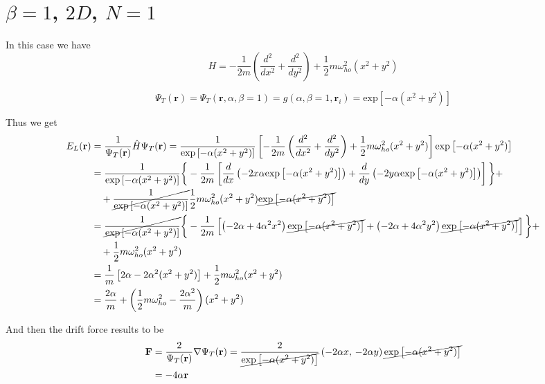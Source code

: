 \documentclass{article}
\begin{document}
\section{$\beta = 1$, $2D$, $N=1$}
In this case we have
\begin{equation*}
     H = -\frac{1}{2m} \left( \frac{d^2}{dx^2} + \frac{d^2}{dy^2} \right) + \frac{1}{2} m \omega_{ho}^2 (x^2 + y^2)
\end{equation*}

\begin{equation*}
    \Psi_T(\mathbf{r})=\Psi_T(\mathbf{r},\alpha,\beta=1)
    = g(\alpha,\beta=1,\mathbf{r}_i) = \text{exp}\left[-\alpha (x^2 + y^2) \right]
\end{equation*}

Thus we get
\begin{align*}
    E_L(\mathbf{r}) &= \frac{1}{\Psi_T(\mathbf{r})} \hat{H} \Psi_T(\mathbf{r}) = \frac{1}{\text{exp}\left[-\alpha (x^2 + y^2) \right]} \left[ -\frac{1}{2m} \left( \frac{d^2}{dx^2} + \frac{d^2}{dy^2} \right) + \frac{1}{2} m \omega_{ho}^2 (x^2 + y^2) \right] \text{exp}\left[-\alpha (x^2 + y^2) \right] \\
    &= \frac{1}{\text{exp}\left[-\alpha (x^2 + y^2) \right]} \bigg\{ -\frac{1}{2m} \left[ \frac{d}{dx} \left( -2x\alpha \text{exp}\left[-\alpha (x^2 + y^2) \right] \right) + \frac{d}{dy} \left( -2y\alpha \text{exp}\left[-\alpha (x^2 + y^2) \right] \right) \right]\bigg\} + \\
    &\quad + \cancel{\frac{1}{\text{exp}\left[-\alpha (x^2 + y^2) \right]}} \frac{1}{2} m \omega_{ho}^2 (x^2 + y^2) \cancel{\text{exp}\left[-\alpha (x^2 + y^2) \right]}  \\
    &= \cancel{\frac{1}{\text{exp}\left[-\alpha (x^2 + y^2) \right]}} \bigg\{ -\frac{1}{2m} \left[ \left( -2\alpha + 4\alpha^2x^2 \right) \cancel{\text{exp}\left[-\alpha (x^2 + y^2) \right]} + \left( -2\alpha + 4\alpha^2 y^2 \right) \cancel{\text{exp}\left[-\alpha (x^2 + y^2) \right]}  \right]\bigg\} + \\
    &\quad + \frac{1}{2} m \omega_{ho}^2 (x^2 + y^2) \\
    &=  \frac{1}{m} \left[ 2\alpha - 2\alpha^2 (x^2 + y^2) \right] + \frac{1}{2} m \omega_{ho}^2 (x^2 + y^2) \\
    &= \frac{2\alpha}{m} + \left( \frac{1}{2} m \omega_{ho}^2 - \frac{2\alpha^2}{m} \right) (x^2 + y^2)
\end{align*}

And then the drift force results to be
\begin{align*}
    \mathbf{F} &= \frac{2}{\Psi_T(\mathbf{r})} \nabla\Psi_T(\mathbf{r}) = \frac{2}{\cancel{\text{exp}\left[-\alpha (x^2 + y^2) \right]}} \left( -2\alpha x,\, - 2\alpha y\right) \cancel{\text{exp}\left[-\alpha (x^2 + y^2) \right]} \\
    &= -4\alpha \mathbf{r} 
\end{align*}
\end{document}
